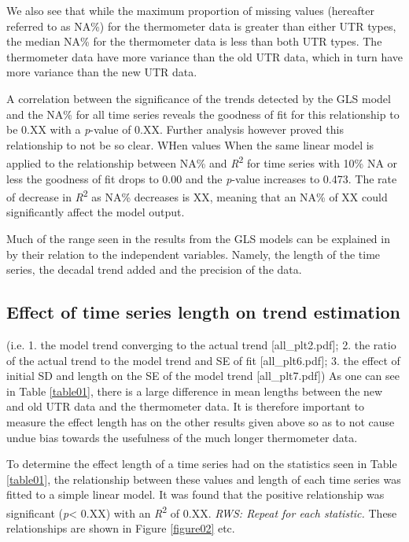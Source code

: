 \documentclass{ametsoc}
\begin{document}
We also see that while the maximum proportion of missing values (hereafter referred to as NA\%) for the thermometer data is greater than either UTR types, the median NA\% for the thermometer data is less than both UTR types. The thermometer data have more variance than the old UTR data, which in turn have more variance than the new UTR data.

A correlation between the significance of the trends detected by the GLS model and the NA\% for all time series reveals the goodness of fit for this relationship to be 0.XX with a \emph{p}-value of 0.XX. Further analysis however proved this relationship to not be so clear. WHen values When the same linear model is applied to the relationship between NA\% and \emph{R}\textsuperscript{2} for time series with 10\% NA or less the goodness of fit drops to 0.00 and the \emph{p}-value increases to 0.473. The rate of decrease in \emph{R}\textsuperscript{2} as NA\% decreases is XX, meaning that an NA\% of XX could significantly affect the model output.

Much of the range seen in the results from the GLS models can be explained in by their relation to the independent variables. Namely, the length of the time series, the decadal trend added and the precision of the data.

\subsection{Effect of time series length on trend estimation}
(i.e. 1. the model trend converging to the actual trend [all_plt2.pdf]; 2. the ratio of the actual trend to the model trend and SE of fit [all_plt6.pdf]; 3. the effect of initial SD and length on the SE of the model trend [all_plt7.pdf])
As one can see in Table \ref{table01}, there is a large difference in mean lengths between the new and old UTR data and the thermometer data. It is therefore important to measure the effect length has on the other results given above so as to not cause undue bias towards the usefulness of the much longer thermometer data.

To determine the effect length of a time series had on the statistics seen in Table \ref{table01}, the relationship between these values and length of each time series was fitted to a simple linear model. It was found that the positive relationship was significant (\emph{p}\num{< 0.XX}) with an \emph{R}\textsuperscript{2} of 0.XX. \emph{RWS: Repeat for each statistic.} These relationships are shown in Figure \ref{figure02} etc.
\end{document}
